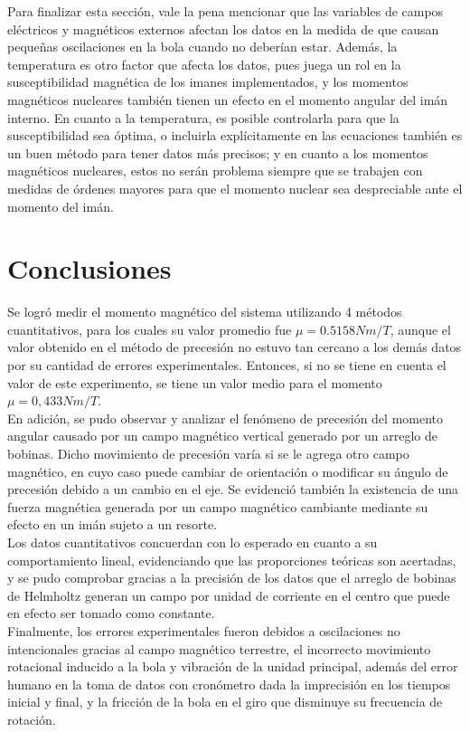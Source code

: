 \documentclass[%
 reprint,
 amsmath,amssymb,
 aps,
]{revtex4-1}
\begin{document}
Para finalizar esta sección, vale la pena mencionar que las variables de campos eléctricos y magnéticos externos afectan los datos en la medida de que causan pequeñas oscilaciones en la bola cuando no deberían estar. Además, la temperatura es otro factor que afecta los datos, pues juega un rol en la susceptibilidad magnética de los imanes implementados, y los momentos magnéticos nucleares también tienen un efecto en el momento angular del imán interno. En cuanto a la temperatura, es posible controlarla para que la susceptibilidad sea óptima, o incluirla explícitamente en las ecuaciones también es un buen método para tener datos más precisos; y en cuanto a los momentos magnéticos nucleares, estos no serán problema siempre que se trabajen con medidas de órdenes mayores para que el momento nuclear sea despreciable ante el momento del imán.

\section{Conclusiones}
Se logró medir el momento magnético del sistema utilizando 4 métodos cuantitativos, para los cuales su valor promedio fue $\mu = 0.5158 Nm/T$, aunque el valor obtenido en el método de precesión no estuvo tan cercano a los demás datos por su cantidad de errores experimentales. Entonces, si no se tiene en cuenta el valor de este experimento, se tiene un valor medio para el momento $\mu = 0,433 Nm/T$. \\
En adición, se pudo observar y analizar el fenómeno de precesión del momento angular causado por un campo magnético vertical generado por un arreglo de bobinas. Dicho movimiento de precesión varía si se le agrega otro campo magnético, en cuyo caso puede cambiar de orientación o modificar su ángulo de precesión debido a un cambio en el eje.
Se evidenció también la existencia de una fuerza magnética generada por un campo magnético cambiante mediante su efecto en un imán sujeto a un resorte. \\
Los datos cuantitativos concuerdan con lo esperado en cuanto a su comportamiento lineal, evidenciando que las proporciones teóricas son acertadas, y se pudo comprobar gracias a la precisión de los datos que el arreglo de bobinas de Helmholtz generan un campo por unidad de corriente en el centro que puede en efecto ser tomado como constante.\\
Finalmente, los errores experimentales fueron debidos a oscilaciones no intencionales gracias al campo magnético terrestre, el incorrecto movimiento rotacional inducido a la bola y vibración de la unidad principal, además del error humano en la toma de datos con cronómetro dada la imprecisión en los tiempos inicial y final, y la fricción de la bola en el giro que disminuye su frecuencia de rotación. 
\end{document}
